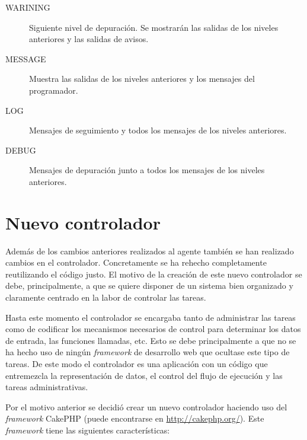 \begin{description}
\begin{description}
		\item[WARINING] Siguiente nivel de depuración. Se mostrarán las salidas de los niveles anteriores y las salidas de avisos.
		
		\item[MESSAGE] Muestra las salidas de los niveles anteriores y los mensajes del programador.
		
		\item[LOG] Mensajes de seguimiento y todos los mensajes de los niveles anteriores.

		\item[DEBUG] Mensajes de depuración junto a todos los mensajes de los niveles anteriores.
	\end{description}
\end{description}


\section{Nuevo controlador}

Además de los cambios anteriores realizados al agente también se han realizado cambios en el controlador. Concretamente se ha rehecho completamente reutilizando el código justo. El motivo de la creación de este nuevo controlador se debe, principalmente, a que se quiere disponer de un sistema bien organizado y claramente centrado en la labor de controlar las tareas.

Hasta este momento el controlador se encargaba tanto de administrar las tareas como de codificar los mecanismos necesarios de control para determinar los datos de entrada, las funciones llamadas, etc. Esto se debe principalmente a que no se ha hecho uso de ningún \emph{framework} de desarrollo web que ocultase este tipo de tareas. De este modo el controlador es una aplicación con un código que entremezcla la representación de datos, el control del flujo de ejecución y las tareas administrativas.

Por el motivo anterior se decidió crear un nuevo controlador haciendo uso del \emph{framework} CakePHP (puede encontrarse en \url{http://cakephp.org/}). Este \emph{framework} tiene las siguientes características:

